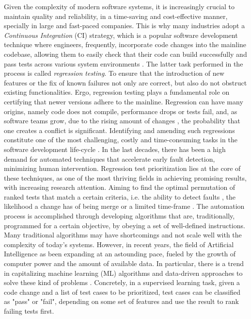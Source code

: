 Given the complexity of modern software systems, it is increasingly crucial to maintain quality and reliability, in a time-saving and cost-effective manner, specially in large and fast-paced companies. This is why many industries adopt a \textit{Continuous Integration} (CI) strategy, which is a popular software development technique where engineers, frequently, incorporate code changes into the mainline codebase, allowing them to easily check that their code can build successfully and pass tests across various system environments \cite{santolucito2018statically}  . The latter task performed in the process is called \textit{regression testing}. To ensure that the introduction of new features or the fix of known failures not only are correct, but also do not obstruct existing functionalities. Ergo, regression testing plays a fundamental role on certifying that newer versions adhere to the mainline.  
Regression can have many origins, namely code does not compile, performance drops or tests fail, and, as software teams grow, due to the rising amount of changes , the probability that one  creates a conflict is significant. Identifying and amending such regressions constitute one of the most challenging, costly and time-consuming tasks in the software development life-cycle \cite{Ziftci}.
In the last decades, there has been a high demand for automated techniques that accelerate early fault detection, minimizing human intervention. Regression test prioritization lies at the core of these techniques, as one of the most thriving fields in achieving promising results, with increasing research attention. Aiming to find the optimal permutation of ranked tests that match a certain criteria, i.e. the ability to detect faults , the likelihood a change has of being merge or a limited time-frame  \cite{palma}. 
The automation process is accomplished through developing algorithms that are, traditionally, programmed for a certain objective, by obeying a set of well-defined instructions. Many traditional algorithms may have shortcomings and not scale well with the complexity of today's systems. However, in recent years, the field of Artificial Intelligence as been expanding at an astounding pace, fueled by the growth of computer power and the amount of available data. In particular, there is a trend in capitalizing machine learning (ML) algorithms and data-driven approaches to solve these kind of problems  \cite{durelli} . Concretely, in a supervised learning task, given a code change and a list of test cases to be prioritized, test cases can be classified as "pass" or "fail", depending on some set of features and use the result to rank failing tests first.

